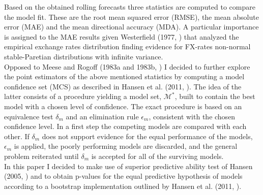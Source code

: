 Based on the obtained rolling forecasts three statistics are computed
to compare the model fit.  These are the root mean squared error
(RMSE), the mean absolute error (MAE) and the mean directional
accuracy (MDA).  A particular importance is assigned to the MAE
results given Westerfield (1977, \cite{Westerfield}) that analyzed the
empirical exchange rates distribution finding evidence for FX-rates
non-normal stable-Paretian distributions with infinite variance.\\
Opposed to Meese and Rogoff (1983a and 1983b, \cite{MeeseRogoffa,
  MeeseRogoffb}) I decided to further explore the point estimators of
the above mentioned statistics by computing a model confidence set
(MCS) as described in Hansen et al. (2011, \cite{HansenMCS}).  The
idea of the latter consists of a procedure yielding a model set,
$\mathcal{M}^*$, built to contain the best model with a chosen level
of confidence. The exact procedure is based on an equivalence test
$\delta_m$ and an elimination rule $\epsilon_m$, consistent with the
chosen confidence level. In a first step the competing models are
compared with each other. If $\delta_m$ does not support evidence for
the equal performance of the models, $\epsilon_m$ is applied, the
poorly performing models are discarded, and the general problem
reiterated until $\delta_m$ is accepted
for all of the surviving models.\\
In this paper I decided to make use of superior predictive ability
test of Hansen (2005, \cite{HansenSPA}) and to obtain p-values for the
equal predictive hypothesis of models according to a bootstrap
implementation outlined by Hansen et al. (2011, \cite{HansenMCS}).
